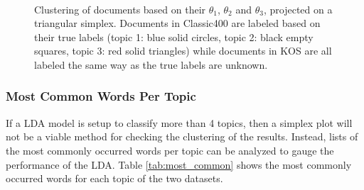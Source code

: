 \documentclass[10pt]{article}
\begin{document}
\begin{figure}
    \centering
    \mbox{ \quad
        }
    \caption{Clustering of documents based on their $\theta_1$, $\theta_2$ and $\theta_3$, projected on a triangular simplex. Documents in Classic400 are labeled based on their true labels (topic 1: blue solid circles, topic 2: black empty squares, topic 3: red solid triangles) while documents in KOS are all labeled the same way as the true labels are unknown.}
    \label{fig:cluserting}
\end{figure}



\subsubsection{Most Common Words Per Topic}
If a LDA model is setup to classify more than 4 topics, then a simplex plot will not be a viable method for checking the clustering of the results. Instead, lists of the most commonly occurred words per topic can be analyzed to gauge the performance of the LDA. Table \ref{tab:most_common} shows the most commonly occurred words for each topic of the two datasets.
\end{document}
